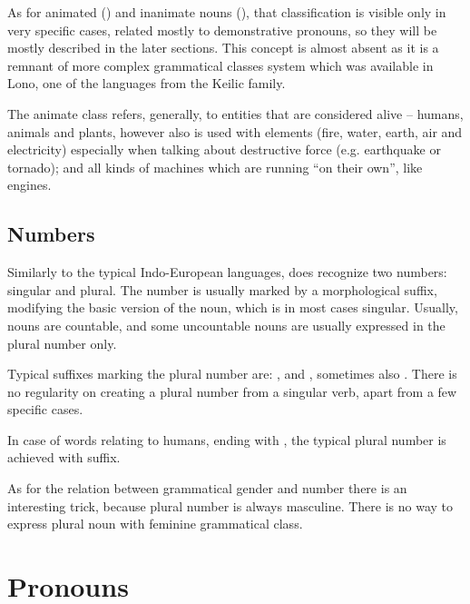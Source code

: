 As for animated (\An{}) and inanimate nouns (\Inan{}), that classification is
visible only in very specific cases, related mostly to demonstrative pronouns,
so they will be mostly described in the later sections. This concept is almost
absent as it is a remnant of more complex grammatical classes system which was
available in Lono, one of the languages from the Keilic family.

The animate class refers, generally, to entities that are considered alive --
humans, animals and plants, however also is used with elements (fire, water,
earth, air and electricity) especially when talking about destructive force
(e.g. earthquake or tornado); and all kinds of machines which are running ``on
their own'', like engines.


\subsection{Numbers}

Similarly to the typical Indo-European languages, \andro does recognize two
numbers: singular and plural. The number is usually marked by a morphological
suffix, modifying the basic version of the noun, which is in most cases
singular. Usually, nouns are countable, and some uncountable nouns are usually
expressed in the plural number only.


Typical suffixes marking the plural number are: ,  and ,
sometimes also . There is no regularity on creating a plural number from
a singular verb, apart from a few specific cases.

In case of words relating to humans, ending with , the typical plural
number is achieved with  suffix.

As for the relation between grammatical gender and number there is an
interesting trick, because plural number is always masculine. There is no way to
express plural noun with feminine grammatical class.

\section{Pronouns}
\label{sec:morph-pronouns}

